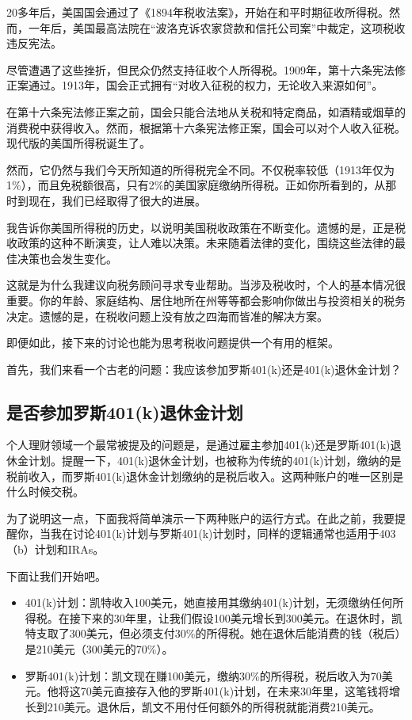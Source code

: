 20多年后，美国国会通过了《1894年税收法案》，开始在和平时期征收所得税。然而，一年后，美国最高法院在“波洛克诉农家贷款和信托公司案”中裁定，这项税收违反宪法。

尽管遭遇了这些挫折，但民众仍然支持征收个人所得税。1909年，第十六条宪法修正案通过。1913年，国会正式拥有“对收入征税的权力，无论收入来源如何”。

在第十六条宪法修正案之前，国会只能合法地从关税和特定商品，如酒精或烟草的消费税中获得收入。然而，根据第十六条宪法修正案，国会可以对个人收入征税。现代版的美国所得税诞生了。

然而，它仍然与我们今天所知道的所得税完全不同。不仅税率较低（1913年仅为1\%），而且免税额很高，只有2\%的美国家庭缴纳所得税。正如你所看到的，从那时到现在，我们已经取得了很大的进展。

我告诉你美国所得税的历史，以说明美国税收政策在不断变化。遗憾的是，正是税收政策的这种不断演变，让人难以决策。未来随着法律的变化，围绕这些法律的最佳决策也会发生变化。

这就是为什么我建议向税务顾问寻求专业帮助。当涉及税收时，个人的基本情况很重要。你的年龄、家庭结构、居住地所在州等等都会影响你做出与投资相关的税务决定。遗憾的是，在税收问题上没有放之四海而皆准的解决方案。

即便如此，接下来的讨论也能为思考税收问题提供一个有用的框架。

首先，我们来看一个古老的问题：我应该参加罗斯401(k)还是401(k)退休金计划？

\subsection{是否参加罗斯401(k)退休金计划}

个人理财领域一个最常被提及的问题是，是通过雇主参加401(k)还是罗斯401(k)退休金计划。提醒一下，401(k)退休金计划，也被称为传统的401(k)计划，缴纳的是税前收入，而罗斯401(k)退休金计划缴纳的是税后收入。这两种账户的唯一区别是什么时候交税。

为了说明这一点，下面我将简单演示一下两种账户的运行方式。在此之前，我要提醒你，当我在讨论401(k)计划与罗斯401(k)计划时，同样的逻辑通常也适用于403（b）计划和IRAs。

下面让我们开始吧。

\begin{itemize}
\item 401(k)计划：凯特收入100美元，她直接用其缴纳401(k)计划，无须缴纳任何所得税。在接下来的30年里，让我们假设100美元增长到300美元。在退休时，凯特支取了300美元，但必须支付30\%的所得税。她在退休后能消费的钱（税后）是210美元（300美元的70\%）。
\item 罗斯401(k)计划：凯文现在赚100美元，缴纳30\%的所得税，税后收入为70美元。他将这70美元直接存入他的罗斯401(k)计划，在未来30年里，这笔钱将增长到210美元。退休后，凯文不用付任何额外的所得税就能消费210美元。
\end{itemize}

